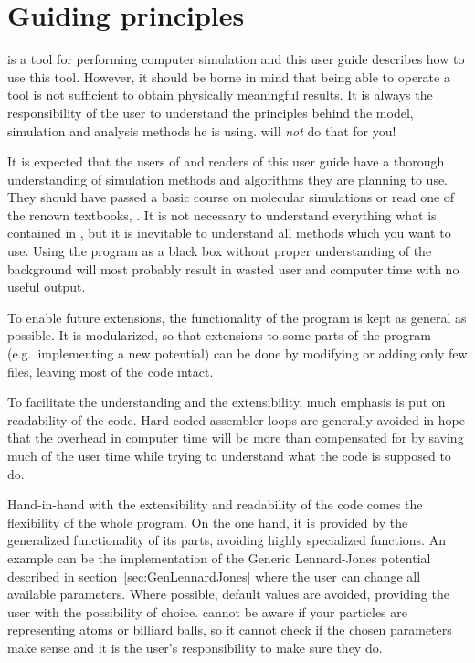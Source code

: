 \section{Guiding principles}
\label{sec:ideas}

\es is a tool for performing computer simulation and this user guide
describes how to use this tool. However, it should be borne in mind
that being able to operate a tool is not sufficient to obtain 
physically meaningful results. It is always the responsibility of the user
to understand the principles behind the model, simulation
and analysis methods he is using. \es will \emph{not} do that for you!

It is expected that the users of \es and readers of this user guide 
have a thorough understanding of simulation methods and algorithms
they are planning to use. They should have passed a basic course on
molecular simulations or read one of the renown textbooks, \eg
\cite{frenkel02b}.  It is not necessary to understand everything
what is contained in \es, but it is inevitable to understand
all methods which you want to use. Using the program as a black box
without proper understanding of the background will most probably result
in wasted user and computer time with no useful output.

To enable future extensions, the functionality of the program is kept
as general as possible. It is modularized, so that extensions to some
parts of the program (e.g.\ implementing a new potential) can be done
by modifying or adding only few files, leaving most of the 
code intact.

To facilitate the understanding and the extensibility, much emphasis is put on readability of the code. Hard-coded assembler loops are 
generally avoided in hope that the overhead in computer time
will be more than compensated for by saving much of the user time 
while trying to understand what the code is supposed to do.

Hand-in-hand with the extensibility and readability of the code comes 
the flexibility of the whole program. On the one hand, it is provided
by the generalized functionality of its parts, avoiding highly specialized
functions. An example can be the implementation of the Generic Lennard-Jones
potential described in section~\ref{sec:GenLennardJones} where the user
can change all available parameters. Where possible, default
values are avoided, providing the user with the possibility of choice.
\es cannot be aware if your particles are representing atoms or billiard
balls, so it cannot check if the chosen parameters make sense and it
is the user's responsibility to make sure they do.

